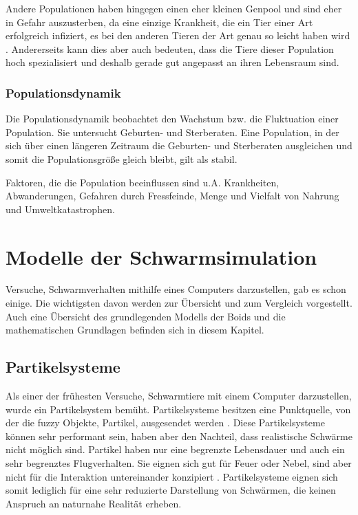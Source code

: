 \documentclass[draft=false
              ,paper=a4
              ,twoside=false
              ,fontsize=11pt
              ,headsepline
              ,BCOR10mm
              ,DIV11
              ,bibtotoc
              ,liststotoc
              ]{scrbook}
\begin{document}
Andere Populationen haben hingegen einen eher kleinen Genpool und sind eher in Gefahr auszusterben, da eine einzige Krankheit, die ein Tier einer Art erfolgreich infiziert, es bei den anderen Tieren der Art genau so leicht haben wird \cite{genetik}. Andererseits kann dies aber auch bedeuten, dass die Tiere dieser Population hoch spezialisiert und deshalb gerade gut angepasst an ihren Lebensraum sind.
\subsection{Populationsdynamik}
Die Populationsdynamik beobachtet den Wachstum bzw. die Fluktuation einer Population. Sie untersucht Geburten- und Sterberaten. Eine Population, in der sich über einen längeren Zeitraum die Geburten- und Sterberaten ausgleichen und somit die Populationsgröße gleich bleibt, gilt als stabil.

Faktoren, die die Population beeinflussen sind u.A. Krankheiten, Abwanderungen, Gefahren durch Fressfeinde, Menge und Vielfalt von Nahrung und Umweltkatastrophen.

\chapter{Modelle der Schwarmsimulation}\label{stand}
Versuche, Schwarmverhalten mithilfe eines Computers darzustellen, gab es schon einige. Die wichtigsten davon werden zur Übersicht und zum Vergleich vorgestellt. Auch eine Übersicht des grundlegenden Modells der Boids und die mathematischen Grundlagen befinden sich in diesem Kapitel.
\section{Partikelsysteme}
Als einer der frühesten Versuche, Schwarmtiere mit einem Computer darzustellen, wurde ein Partikelsystem bemüht. Partikelsysteme besitzen eine Punktquelle, von der die fuzzy Objekte, Partikel, ausgesendet werden \cite{Reeves:1983:PST:357318.357320}. Diese Partikelsysteme können sehr performant sein, haben aber den Nachteil, dass realistische Schwärme nicht möglich sind. Partikel haben nur eine begrenzte Lebensdauer und auch ein sehr begrenztes Flugverhalten. Sie eignen sich gut für Feuer oder Nebel, sind aber nicht für die Interaktion untereinander konzipiert \cite{reynolds87}. Partikelsysteme eignen sich somit lediglich für eine sehr reduzierte Darstellung von Schwärmen, die keinen Anspruch an naturnahe Realität erheben.
\end{document}

